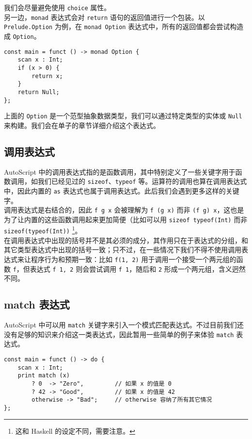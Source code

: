 我们会尽量避免使用 \lstinline!choice! 属性。 \\

另一边，\lstinline!monad! 表达式会对 \lstinline!return! 语句的返回值进行一个包装。以 \lstinline!Prelude.Option! 为例，在 \lstinline!monad Option! 表达式中，所有的返回值都会尝试构造成 \lstinline!Option!。

\begin{lstlisting}
const main = funct () -> monad Option {
	scan x : Int;
	if (x > 0) {
		return x;
	}
	return Null;
};
\end{lstlisting}

上面的 \lstinline!Option! 是一个范型抽象数据类型，我们可以通过特定类型的实体或 \lstinline!Null! 来构建。我们会在单子的章节详细介绍这个表达式。

\subsection{调用表达式}

AutoScript 中的调用表达式指的是函数调用，其中特别定义了一些关键字用于函数调用，如我们已经见过的 \lstinline!sizeof!、\lstinline!typeof! 等。运算符的调用也算在调用表达式中，因此内置的 \lstinline!as! 表达式也属于调用表达式。此后我们会遇到更多这样的关键字。\\

调用表达式是右结合的，因此 \lstinline!f g x! 会被理解为 \lstinline!f (g x)! 而非 \lstinline!(f g) x!，这也是为了让内置的这些函数调用起来更加简便（比如可以用 \lstinline!sizeof typeof(Int)! 而非 \lstinline!sizeof(typeof(Int))! \footnote{这和 Haskell 的设定不同，需要注意。}。 \\

在调用表达式中出现的括号并不是其必须的成分，其作用只在于表达式的分组，和其它类型表达式中出现的括号一致；只不过，在一些情况下我们不得不使用调用表达式来让程序行为和预期一致：比如 \lstinline!f(1, 2)! 用于调用一个接受一个两元组的函数 \lstinline!f!，但表达式 \lstinline!f 1, 2! 则会尝试调用 \lstinline!f 1!，随后和 \lstinline!2! 形成一个两元组，含义迥然不同。

\subsection{match 表达式}

AutoScript 中可以用 \lstinline!match! 关键字来引入一个模式匹配表达式。不过目前我们还没有足够的知识来介绍这一类表达式，因此暂用一些简单的例子来体验 \lstinline!match! 表达式。

\begin{lstlisting}
const main = funct () -> do {
    scan x : Int;
    print match (x)
        ? 0  -> "Zero",			// 如果 x 的值是 0
        ? 42 -> "Good",			// 如果 x 的值是 42
        otherwise -> "Bad";     // otherwise 容纳了所有其它情况
};
\end{lstlisting}

